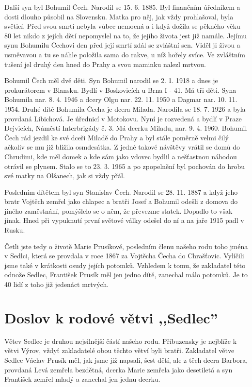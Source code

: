 \documentclass[../dejiny-rodu-prusiku.tex]{subfiles}
\begin{document}
Další syn byl Bohumil Čech. Narodil se 15. 6. 1885. Byl finančním úředníkem a dosti dlouho působil na Slovensku. Matka pro něj, jak vždy prohlašoval, byla světicí. Před svou smrtí nebyla vůbec nemocná a i když dožila se pěkného věku 80 let nikdo z jejích dětí nepomyslel na to, že jejího života jest již namále. Jejímu synu Bohu­milu Čechovi den před její smrtí zdál se zvláštní sen. Viděl ji živou a usměvavou a tu se náhle položila sama do rakve, u níž hořely svíce. Ve zvláštním tušení jel druhý den hned do Prahy a svou maminku nalezl mrtvou.

Bohumil Čech měl dvě děti. Syn Bohumil narodil se 2. 1. 1918 a dnes je prokurátorem v Blansku. Bydlí v Boskovicích u Brna I - 41. Má tři děti. Syna Bohumila nar. 8. 4. 1946 a dcery Olgu nar. 22. 11. 1950 a Dagmar nar. 10. 11. 1954. Druhé dítě Bohumila Čecha je dcera Milada. Narodila se 18. 7. 1926 a byla provdaná Libichová. Je úřednicí v Motokovu. Nyní je rozvedená a bydlí v Praze Dejvicích, Náměstí Interbrigády č. 3. Má dcerku Miladu, nar. 9. 4. 1960. Bohumil Čech rád jezdil ke své dceři Miladě do Prahy a byl stále poměrně velmi čilý ačkoliv se mu již blížila osmdesátka. Z jedné takové návštěvy vrátil se domů do Chrudimi, kde měl domek a kde sám jako vdovec bydlil a nešťastnou náhodou otrávil se plynem. Stalo se to 23. 3. 1965 a po zpopelnění byl pochován do hrobu své matky na Olšanech, jak si vždy přál.

Posledním dítětem byl syn Stanislav Čech. Narodil se 28. 11. 1887 a když jeho bratr Vojtěch zemřel jako chlapec a bratři Josef a Bohumil odešli z domova do jiného zaměst­nání, pomýšlelo se o něm, že převezme statek. Dopadlo to však jinak. Hned při vypuknutí první světové války odešel do ní a na jaře 1915 padl v Rusku.

Četli jste tedy o životě Marie Prusíkové, posledním členu našeho rodu toho jména v Sedlci, která se provdala v roce 1867 za Vojtěcha Čecha do Chrašťovic. Vylíčili jsme také v krátkosti osudy jejích potomků. Vzhledem k tomu, že zakladatel této odnože Sedlec, František Prusík měl jen jedno dítě, zanechal málo potomků. Je to 40 lidí z toho již jedenáct mrtvých.

\section{Doslov k rodové větvi ,,Sedlec''}
Větev Sedlec je druhou nejsilnější částí našeho rodu. Příbuzensky je nejblíže k větvi Výrov, vždyť zaklada­telé obou těchto větví byli bratři. Zakladatel větve Sedlec Václav Prusík měl, jak jsme již napsali, šest dě­tí, ale z těch dcera Barbora, provdaná Levá zemřela bezdětná, dcerka Marie zemřela jako desetiletá a syn František zemřel mladý a zanechal jen jednu dcerku.
\end{document}
